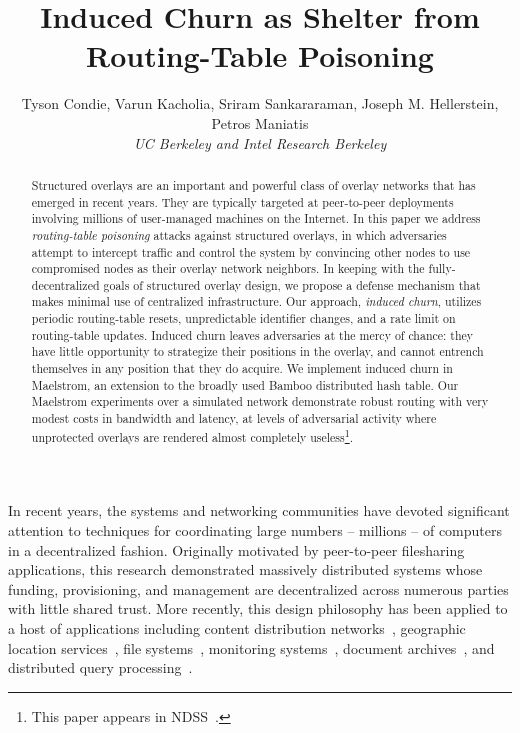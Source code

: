 \documentclass[10pt,twocolumn]{article}
\begin{document}
\title{Induced Churn as Shelter from Routing-Table
  Poisoning}
\author{
Tyson Condie, Varun Kacholia, Sriram Sankararaman, Joseph
M. Hellerstein, Petros Maniatis\\
\emph{UC Berkeley and Intel Research Berkeley}
}


\maketitle

\thispagestyle{empty}
\begin{abstract}
Structured overlays are an important and powerful class of
overlay networks that has emerged in recent years.  They are typically
targeted at peer-to-peer deployments involving millions of
user-managed machines on the Internet.  In this paper we address
{\em routing-table poisoning} attacks against structured overlays, in
which adversaries attempt to
intercept traffic and control the system by convincing other nodes to
use compromised nodes as their overlay network neighbors.  In keeping
with the fully-decentralized goals of structured overlay design, we propose a defense
mechanism that makes minimal use of centralized infrastructure.  Our
approach, {\em induced churn}, utilizes periodic routing-table resets,
unpredictable identifier changes, and a rate limit on
routing-table updates. Induced churn leaves adversaries at the mercy
of chance: they have little opportunity to strategize their positions
in the overlay, and cannot entrench themselves in any position that
they do acquire.  We implement induced churn in Maelstrom, an extension
to the broadly used Bamboo distributed hash table. Our
Maelstrom experiments over a simulated network demonstrate 
robust routing with very modest costs in bandwidth and latency, at
levels of adversarial activity where unprotected overlays
are rendered almost completely useless\footnote{This paper appears in NDSS~\cite{Condie2005}.}.
\end{abstract}

\label{sec:introduction}
In recent
years, the systems and networking communities have devoted significant
attention to techniques for coordinating large numbers -- millions
-- of computers in a decentralized fashion.   Originally motivated by
peer-to-peer filesharing applications, this research 
demonstrated massively distributed systems whose funding,
provisioning, and management are decentralized across numerous
parties with little shared trust.  More recently, this design
philosophy has been applied to a host of applications including
content distribution networks~\cite{Freedman2004}, geographic location
services~\cite{LaMarca2005}, file systems~\cite{Dabek2001},
monitoring systems~\cite{Bharambe2004}, document archives~\cite{Stribling2005}, and distributed query
processing~\cite{Loo2004}.  
\end{document}
